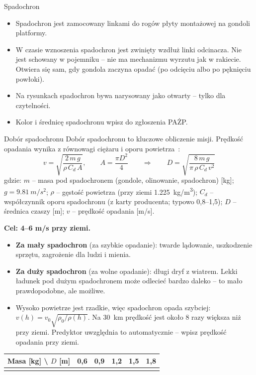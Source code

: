 \begin{sekcja}{Spadochron}\label{sec:spadochron-sekcja}
\begin{itemize}
  \item Spadochron jest zamocowany linkami do rogów płyty montażowej na gondoli platformy.
  \item W czasie wznoszenia spadochron jest zwinięty wzdłuż linki odcinacza. Nie jest schowany w pojemniku -- nie ma mechanizmu wyrzutu jak w rakiecie. Otwiera się sam, gdy gondola zaczyna opadać (po odcięciu albo po pęknięciu powłoki).
  \item Na rysunkach spadochron bywa narysowany jako otwarty -- tylko dla czytelności.
  \item Kolor i średnicę spadochronu wpisz do zgłoszenia PAŻP.
\end{itemize}
\end{sekcja}

\begin{podsekcja}{Dobór spadochronu}\label{sec:spadochron}
Dobór spadochronu to kluczowe obliczenie misji. Prędkość opadania wynika z równowagi ciężaru i oporu powietrza~\cite[rozdz.~14]{nasahb}:
\[
  v = \sqrt{\frac{2\,m\,g}{\rho\,C_d\,A}}, \qquad A = \frac{\pi D^2}{4}
  \qquad\Longrightarrow\qquad
  D = \sqrt{\frac{8\,m\,g}{\pi\,\rho\,C_d\,v^2}}
\]
gdzie: $m$ -- masa pod spadochronem (gondole, olinowanie, spadochron) [kg]; $g = \SI{9.81}{m/s^2}$; $\rho$ -- gęstość powietrza (przy ziemi \SI{1.225}{kg/m^3}); $C_d$ -- współczynnik oporu spadochronu (z karty producenta; typowo 0,8--1,5); $D$ -- średnica czaszy [m]; $v$ -- prędkość opadania [m/s].

\textbf{Cel: 4--6 m/s przy ziemi.}
\begin{itemize}
  \item \textbf{Za mały spadochron} (za szybkie opadanie): twarde lądowanie, uszkodzenie sprzętu, zagrożenie dla ludzi i mienia.
  \item \textbf{Za duży spadochron} (za wolne opadanie): długi dryf z wiatrem. Lekki ładunek pod dużym spadochronem może odlecieć bardzo daleko -- to mało prawdopodobne, ale możliwe.
  \item Wysoko powietrze jest rzadkie, więc spadochron opada szybciej: $v(h) = v_0\sqrt{\rho_0/\rho(h)}$. Na \SI{30}{km} prędkość jest około 8 razy większa niż przy ziemi. Predyktor uwzględnia to automatycznie -- wpisz prędkość opadania przy ziemi.
\end{itemize}

\small
\begin{tabularx}{\linewidth}{@{}P{26mm}YYYYY@{}}
\toprule
\textbf{Masa [kg]} \textbackslash{} \textbf{$D$ [m]} & \textbf{0,6} & \textbf{0,9} & \textbf{1,2} & \textbf{1,5} & \textbf{1,8}\\\midrule
{}
\bottomrule
\end{tabularx}
\normalsize
{}\label{tab:spadochron}
\end{podsekcja}

